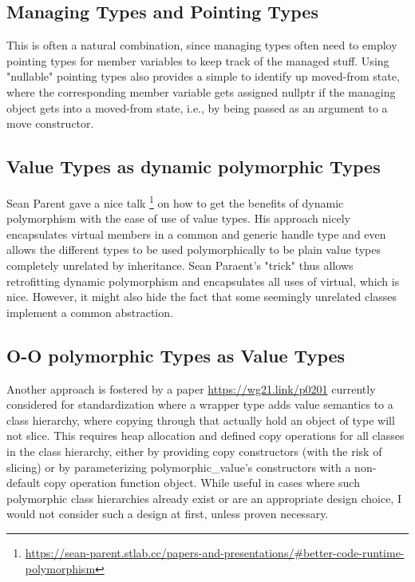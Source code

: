 \documentclass[ebook,11pt,article]{memoir}
\begin{document}
\subsection{Managing Types and Pointing Types}
This is often a natural combination, since managing types often need to employ pointing types for member variables to keep track of the managed stuff. Using "nullable" pointing types also provides a simple to identify up moved-from state, where the corresponding member variable gets assigned nullptr if the managing object gets into a moved-from state, i.e., by being passed as an argument to a move constructor.

\subsection{Value Types as dynamic polymorphic Types}
Sean Parent gave a nice talk \footnote{\url{https://sean-parent.stlab.cc/papers-and-presentations/\#better-code-runtime-polymorphism}} on how to get the benefits of dynamic polymorphism with the ease of use of value types. His approach nicely encapsulates virtual members in a common and generic handle type and even allows the different types to be used polymorphically to be plain value types completely unrelated by inheritance.
Sean Paraent's "trick" thus allows retrofitting dynamic polymorphism and encapsulates all uses of virtual, which is nice. However, it might also hide the fact that some seemingly unrelated classes implement a common abstraction.

\subsection{O-O polymorphic Types as Value Types}
Another approach is fostered by a paper \url{https://wg21.link/p0201} currently considered for standardization where a  wrapper type adds value semantics to a class hierarchy, where copying through  that actually hold an object of type  will not slice. This requires heap allocation and defined copy operations for all classes in the class hierarchy, either by providing copy constructors (with the risk of slicing) or by parameterizing polymorphic_value's constructors with a non-default copy operation function object. While useful in cases where such polymorphic class hierarchies already exist or are an appropriate design choice, I would not consider such a design at first, unless proven necessary.
\end{document}
